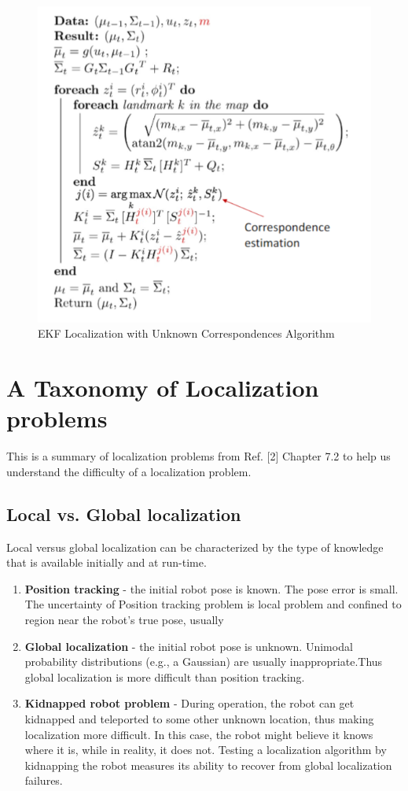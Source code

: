 \documentclass[twoside]{article}
\begin{document}
\begin{figure}[H]
\centering
\includegraphics[width=.5\linewidth]{EKFLocatlizationUnknownCoresspondence.png}
\caption{EKF Localization with Unknown Correspondences Algorithm}
\label{fig:UnknownCoresspondences}
\end{figure}

\section{A Taxonomy of Localization problems}
This is a summary of localization problems from Ref. [2] Chapter 7.2 to help us understand the difficulty of a localization problem.

\subsection{Local vs. Global localization}
Local versus global localization can be characterized by the type of knowledge that is available initially
and at run-time.
\begin{enumerate}
    \item \textbf{Position tracking} - the initial robot pose is known. The pose error is small. The uncertainty of Position tracking problem is local problem and confined to region near the robot’s true pose, usually
    \item \textbf{Global localization} - the initial robot pose is unknown. Unimodal probability distributions (e.g., a Gaussian) are usually inappropriate.Thus global localization is more difficult than position tracking.
    \item \textbf{Kidnapped robot problem} - During operation, the robot can get kidnapped and teleported to some other unknown location, thus making localization more difficult. In this case, the robot might believe it knows where it is, while in reality, it does not. Testing a localization algorithm by kidnapping the robot measures its ability to recover from global localization failures.
\end{enumerate}
\end{document}
